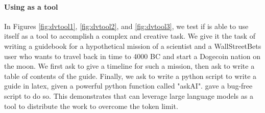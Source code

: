 \paragraph{Using {\DV} as a tool}
In Figures \ref{fig:dvtool1}, \ref{fig:dvtool2}, and \ref{fig:dvtool3}, we test if {\DV} is able to use itself as a tool to accomplish a complex and creative task. We give it the task of writing a guidebook for a hypothetical mission of a scientist and a WallStreetBets user who wants to travel back in time to 4000 BC and start a Dogecoin nation on the moon. We first ask {\DV} to give a timeline for such a mission, then ask {\DV} to write a table of contents of the guide. Finally, we ask {\DV} to write a python script to write a guide in latex, given a powerful python function called "askAI". {\DV} gave a bug-free script to do so. This demonstrates that {\DV} can leverage large language models as a tool to distribute the work to overcome the token limit.

